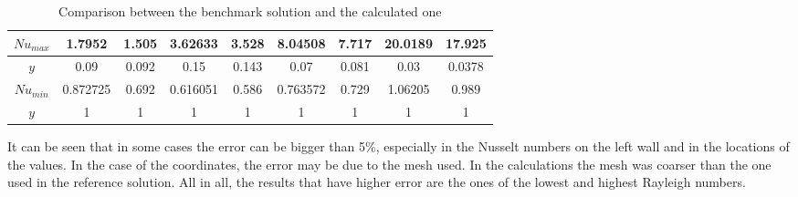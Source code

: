\begin{table}[h]
\begin{tabular}{c|c|c|c|c|c|c|c|c|}
		\multicolumn{1}{|c|}{$Nu_{max}$} & 1.7952                    & 1.505                & 3.62633                   & 3.528                & 8.04508                   & 7.717                & 20.0189                   & 17.925               \\ \hline
		\multicolumn{1}{|c|}{$y$}     & 0.09                      & 0.092                & 0.15                      & 0.143                & 0.07                      & 0.081                & 0.03                      & 0.0378               \\ \hline
		\multicolumn{1}{|c|}{$Nu_{min}$} & 0.872725                  & 0.692                & 0.616051                  & 0.586                & 0.763572                  & 0.729                & 1.06205                   & 0.989                \\ \hline
		\multicolumn{1}{|c|}{$y$}     & 1                         & 1                    & 1                         & 1                    & 1                         & 1                    & 1                         & 1                    \\ \hline
	\end{tabular}
\caption[Comparison between the benchmark solution and the calculated one]{Comparison between the benchmark solution and the calculated one \cite{DeVahlDavis1983}}
\label{ComparisonDiffHeated}
\end{table}

It can be seen that in some cases the error can be bigger than 5\%, especially in the Nusselt numbers on the left wall and in the locations of the values. In the case of the coordinates, the error may be due to the mesh used. In the calculations the mesh was coarser than the one used in the reference solution. All in all, the results that have higher error are the ones of the lowest and highest Rayleigh numbers.

